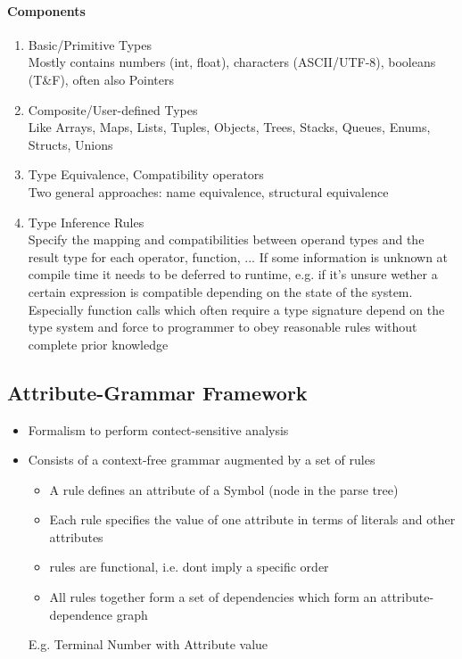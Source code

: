 \paragraph{Components}
\begin{enumerate}
    \item Basic/Primitive Types \\
    Mostly contains numbers (int, float), characters (ASCII/UTF-8), booleans (T\&F), often also Pointers
    \item Composite/User-defined Types \\
    Like Arrays, Maps, Lists, Tuples, Objects, Trees, Stacks, Queues, Enums, Structs, Unions
    \item Type Equivalence, Compatibility operators \\
    Two general approaches: name equivalence, structural equivalence
    \item Type Inference Rules \\
    Specify the mapping and compatibilities between operand types and the result type for each operator, function, ... If some information is unknown at compile time it needs to be deferred to runtime, e.g. if it's unsure wether a certain expression is compatible depending on the state of the system. \\
    Especially function calls which often require a type signature depend on the type system and force to programmer to obey reasonable rules without complete prior knowledge
\end{enumerate}

\subsection{Attribute-Grammar Framework}
\begin{itemize}
    \item Formalism to perform contect-sensitive analysis
    \item Consists of a context-free grammar augmented by a set of rules 
    \begin{itemize}
        \item A rule defines an attribute of a Symbol (node in the parse tree)
        \item Each rule specifies the value of one attribute in terms of literals and other attributes
        \item rules are functional, i.e. dont imply a specific order
        \item All rules together form a set of dependencies which form an attribute-dependence graph
    \end{itemize}
    E.g. Terminal Number with Attribute value
\end{itemize}

